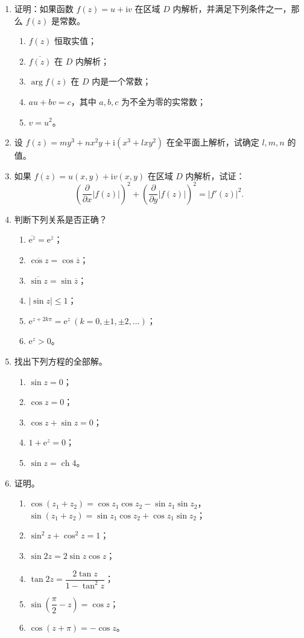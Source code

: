 \documentclass[UTF8,11pt,a4paper]{ctexart}
\newcommand{\ee}{\mathrm{e}}
\newcommand{\ii}{\mathrm{i}}
\newcommand{\ch}{\operatorname{ch}}
\begin{document}
\begin{enumerate}
\item 证明：如果函数 $f(z)=u+\ii v$ 在区域 $D$ 内解析，并满足下列条件之一，那么 $f(z)$ 是常数。
  \begin{enumerate}
  \item $f(z)$ 恒取实值；
  \item $\overline{f(z)}$ 在 $D$ 内解析；
  \item $\arg f(z)$ 在 $D$ 内是一个常数；
  \item $au+bv=c$，其中 $a,b,c$ 为不全为零的实常数；
  \item $v=u^2$。
  \end{enumerate}

\item 设 $f(z)=my^3+nx^2y+\ii(x^3+lxy^2)$ 在全平面上解析，试确定 $l,m,n$ 的值。

\item 如果 $f(z)=u(x,y)+\ii v(x,y)$ 在区域 $D$ 内解析，试证：
\[
\left(\frac{\partial}{\partial x}|f(z)|\right)^2+
\left(\frac{\partial}{\partial y}|f(z)|\right)^2=|f'(z)|^2.
\]

\item 判断下列关系是否正确？
  \begin{enumerate}
  \item $\overline{\ee^z}=\ee^{\overline z}$；
  \item $\overline{\cos z}=\cos\overline z$；
  \item $\overline{\sin z}=\sin\overline z$；
  \item $|\sin z|\leqslant1$；
  \item $\ee^{z+2k\pi}=\ee^z\ (k=0,\pm1,\pm2,\ldots)$；
  \item $\ee^z>0$。
  \end{enumerate}

\item 找出下列方程的全部解。
  \begin{enumerate}
  \item $\sin z=0$；
  \item $\cos z=0$；
  \item $\cos z+\sin z=0$；
  \item $1+\ee^z=0$；
  \item $\sin z=\ch4$。
  \end{enumerate}

\item 证明。
  \begin{enumerate}
  \item $\cos(z_1+z_2)=\cos z_1\cos z_2-\sin z_1\sin z_2$，
  $\sin(z_1+z_2)=\sin z_1\cos z_2+\cos z_1\sin z_2$；
  \item $\sin^2z+\cos^2z=1$；
  \item $\sin2z=2\sin z\cos z$；
  \item $\tan2z=\dfrac{2\tan z}{1-\tan^2z}$；
  \item $\sin\left(\dfrac\pi2-z\right)=\cos z$；
  \item $\cos(z+\pi)=-\cos z$。
  \end{enumerate}


\end{enumerate}
\end{document}
